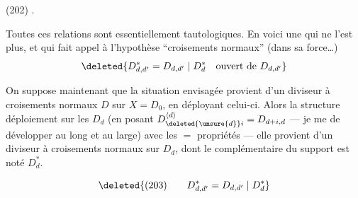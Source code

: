 (202)\quad
{}.

Toutes ces relations sont essentiellement tautologiques. En voici une qui ne l'est plus, et qui fait  appel à  l'hypothèse ``croisements normaux'' (dans  sa force\ldots)
\[
\deleted{D_{d,d'}^*=D_{d,d'}\mid D_d^*\quad\text{ouvert de }D_{d,d'}}
\]

On suppose maintenant que la situation envisagée provient d'un diviseur à croisements normaux $D$ sur $X=D_0$, en déployant celui-ci. Alors  la structure  déploiement  sur les $D_d$ (en posant $D_{\deleted{\unsure{d}}i}^{\langle d\rangle}=D_{d+i,d}$ --- je me  de développer au long et au large) avec les $=$ propriétés --- elle provient d'un diviseur à croisements normaux  sur $D_d$, dont le complémentaire du support est noté $D_d^*$.

\[
\deleted{(203)\qquad D_{d,d'}^*=D_{d,d'}\mid D_d^*}
\]

